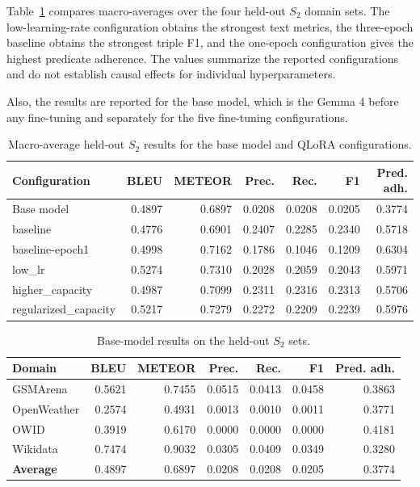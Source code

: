 Table~\ref{tab:finetune-results} compares macro-averages over the four held-out
$S_2$ domain sets. The low-learning-rate configuration obtains the strongest
text metrics, the three-epoch baseline obtains the strongest triple F1, and the
one-epoch configuration gives the highest predicate adherence. The values
summarize the reported configurations and do not establish causal effects for
individual hyperparameters.

Also, the results are reported for the base model, which is the Gemma 4 before any fine-tuning and separately for the five
fine-tuning configurations.

\newcommand{\finetuneheader}{\textbf{Domain} & \textbf{BLEU} & \textbf{METEOR} & \textbf{Prec.} & \textbf{Rec.} & \textbf{F1} & \textbf{Pred. adh.} \\}

\begin{table}[!htbp]
\centering
\caption{Macro-average held-out $S_2$ results for the base model and QLoRA configurations.}
\label{tab:finetune-results}
\begin{tabular}{lrrrrrr}
\hline
\textbf{Configuration} & \textbf{BLEU} & \textbf{METEOR} & \textbf{Prec.} & \textbf{Rec.} & \textbf{F1} & \textbf{Pred. adh.} \\
\hline
Base model & 0.4897 & 0.6897 & 0.0208 & 0.0208 & 0.0205 & 0.3774 \\
baseline & 0.4776 & 0.6901 & 0.2407 & 0.2285 & 0.2340 & 0.5718 \\
baseline-epoch1 & 0.4998 & 0.7162 & 0.1786 & 0.1046 & 0.1209 & 0.6304 \\
low\_lr & 0.5274 & 0.7310 & 0.2028 & 0.2059 & 0.2043 & 0.5971 \\
higher\_capacity & 0.4987 & 0.7099 & 0.2311 & 0.2316 & 0.2313 & 0.5706 \\
regularized\_capacity & 0.5217 & 0.7279 & 0.2272 & 0.2209 & 0.2239 & 0.5976 \\
\hline
\end{tabular}
\end{table}

\begin{table}[!htbp]
\centering
\caption{Base-model results on the held-out $S_2$ sets.}
\label{tab:finetune-base-results}
\begin{tabular}{lrrrrrr}
\hline
\finetuneheader
\hline
GSMArena & 0.5621 & 0.7455 & 0.0515 & 0.0413 & 0.0458 & 0.3863 \\
OpenWeather & 0.2574 & 0.4931 & 0.0013 & 0.0010 & 0.0011 & 0.3771 \\
OWID & 0.3919 & 0.6170 & 0.0000 & 0.0000 & 0.0000 & 0.4181 \\
Wikidata & 0.7474 & 0.9032 & 0.0305 & 0.0409 & 0.0349 & 0.3280 \\
\hline
\textbf{Average} & 0.4897 & 0.6897 & 0.0208 & 0.0208 & 0.0205 & 0.3774 \\
\hline
\end{tabular}
\end{table}

